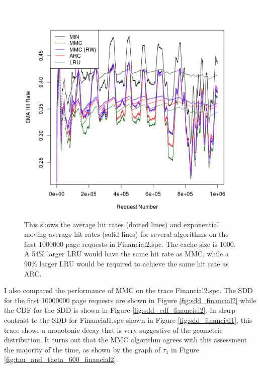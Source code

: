   \begin{figure}
  \centering
  \includegraphics[width=6in]{../media/ts_1000_1000_4000_2.png}
  \caption[Rolling hit rate for 1000 page caches on trace Financial2.spc]{This
  shows the average hit rates (dotted lines) and exponential moving average hit
  rates (solid lines) for several algorithms on the first 1000000 page requests
  in Financial2.spc. The cache size is 1000. A 54\% larger LRU would have the
  same hit rate as MMC, while a 90\% larger LRU would be required to achieve the
  same hit rate as ARC.}
  \label{fig:ts_1000_financial2}
  \end{figure}

  I also compared the performance of MMC on the trace Financial2.spc. The SDD
  for the first 10000000 page requests are shown in Figure
  \ref{fig:sdd_financial2} while the CDF for the SDD is shown in Figure
  \ref{fig:sdd_cdf_financial2}. In sharp contrast to the SDD for Financial1.spc
  shown in Figure \ref{fig:sdd_financial1}, this trace shows a monotonic decay
  that is very suggestive of the geometric distribution. It turns out that the
  MMC algorithm agrees with this assessment the majority of the time, as shown
  by the graph of $\tau_1$ in Figure \ref{fig:tau_and_theta_600_financial2}.

